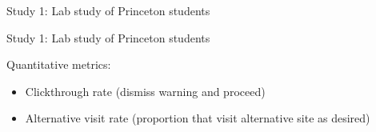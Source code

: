 \documentclass[aspectratio=169]{beamer}
\begin{document}
\begin{frame}

Study 1: Lab study of Princeton students

\setcounter{subfigure}{0}
\begin{figure}
  \centering
  \hspace{0in}
\end{figure}


\end{frame}
\begin{frame}

Study 1: Lab study of Princeton students

\setcounter{subfigure}{0}
\begin{figure}
  \centering
  \hspace{0in}
\end{figure}

\vfill
Quantitative metrics:
\begin{itemize}
\item Clickthrough rate (dismiss warning and proceed)
\item Alternative visit rate (proportion that visit alternative site as desired)
\end{itemize}

\end{frame}
\end{document}
